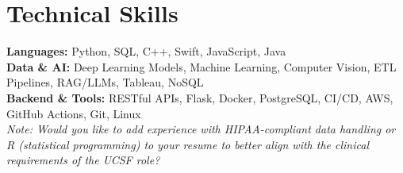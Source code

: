 \documentclass[letterpaper,11pt]{article}
\begin{document}
\section*{Technical Skills}
\textbf{Languages:} Python, SQL, C++, Swift, JavaScript, Java \\
\textbf{Data \& AI:} Deep Learning Models, Machine Learning, Computer Vision, ETL Pipelines, RAG/LLMs, Tableau, NoSQL \\
\textbf{Backend \& Tools:} RESTful APIs, Flask, Docker, PostgreSQL, CI/CD, AWS, GitHub Actions, Git, Linux \\

\textit{Note: Would you like to add experience with HIPAA-compliant data handling or R (statistical programming) to your resume to better align with the clinical requirements of the UCSF role?}
\end{document}
